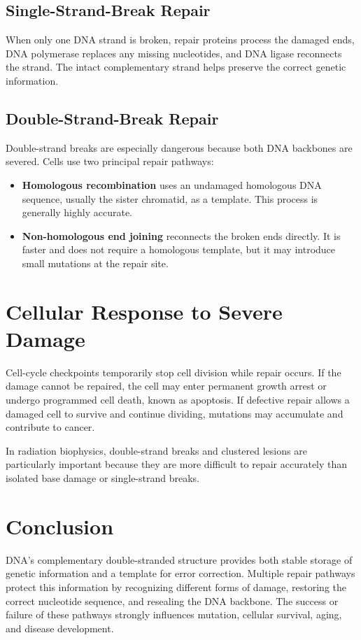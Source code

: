 \documentclass[12pt]{article}
\begin{document}
\subsection{Single-Strand-Break Repair}

When only one DNA strand is broken, repair proteins process the damaged ends,
DNA polymerase replaces any missing nucleotides, and DNA ligase reconnects the
strand. The intact complementary strand helps preserve the correct genetic
information.

\subsection{Double-Strand-Break Repair}

Double-strand breaks are especially dangerous because both DNA backbones are
severed. Cells use two principal repair pathways:

\begin{itemize}
    \item \textbf{Homologous recombination} uses an undamaged homologous DNA
    sequence, usually the sister chromatid, as a template. This process is
    generally highly accurate.
    \item \textbf{Non-homologous end joining} reconnects the broken ends
    directly. It is faster and does not require a homologous template, but it
    may introduce small mutations at the repair site.
\end{itemize}

\section{Cellular Response to Severe Damage}

Cell-cycle checkpoints temporarily stop cell division while repair occurs. If
the damage cannot be repaired, the cell may enter permanent growth arrest or
undergo programmed cell death, known as apoptosis. If defective repair allows
a damaged cell to survive and continue dividing, mutations may accumulate and
contribute to cancer.

In radiation biophysics, double-strand breaks and clustered lesions are
particularly important because they are more difficult to repair accurately
than isolated base damage or single-strand breaks.

\section{Conclusion}

DNA's complementary double-stranded structure provides both stable storage of
genetic information and a template for error correction. Multiple repair
pathways protect this information by recognizing different forms of damage,
restoring the correct nucleotide sequence, and resealing the DNA backbone.
The success or failure of these pathways strongly influences mutation,
cellular survival, aging, and disease development.
\end{document}
